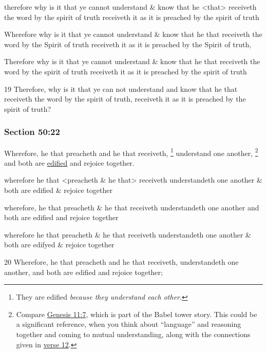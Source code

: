 		\begin{framed}
		\scriptsize
			\begin{compactdesc}
				\item[JSP] therefore why is it that ye cannot understand \& know that he <that> receiveth the word by the spirit of truth receiveth it as it is preached by the spirit of truth
				\item[Gilbert] Wherefore why is it that ye cannot understand \& know that he that receiveth the word by the Spirit of truth receiveth it as it is preached by the Spirit of truth,
				\item[Hyde and Smith] Therefore why is it that ye cannot understand \& know that he that receiveth the word by the spirit of truth receiveth it as it is preached by the spirit of truth
				\item[BC] 19 Therefore, why is it that ye can not understand and know that he that receiveth the word by the spirit of truth, receiveth it as it is preached by the spirit of truth?
			\end{compactdesc}
		\end{framed}

	\subsubsection{Section 50:22} %
		\label{DC50-22}

		Wherefore, he that preacheth and he that receiveth,
		\footnote{%
			They are edified \textit{because they understand each other}.
			}%
		understand one another,%
			\footnote{%
				Compare \hyperref[GENESIS-11-7]{Genesis 11:7}, which is part of the Babel tower story. This could be a significant reference, when you think about ``language'' and reasoning together and coming to mutual understanding, along with the connections given in \hyperref[DC50-12]{verse 12}.
				}
		and both are \hyperref[EDIFICATION]{edified} and rejoice together.

		\begin{framed}
		\scriptsize
			\begin{compactdesc}
				\item[JSP] wherefore he that <preacheth \& he that> receiveth understandeth one another \& both are edified \& rejoice together
				\item[Gilbert] wherefore, he that preacheth \& he that receiveth understandeth one another and both are edified and rejoice together
				\item[Hyde and Smith] wherefore he that preacheth \& he that receiveth understandeth one another \& both are edifyed \& rejoice together
				\item[BC] 20 Wherefore, he that preacheth and he that receiveth, understandeth one another, and both are edified and rejoice together;
			\end{compactdesc}
		\end{framed}

